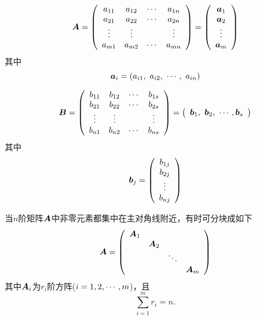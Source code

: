 \begin{dingyi}[矩阵的按行分块]
  $$
  \boldsymbol{A} = \left(
    \begin{array}{cccc}
      a_{11} & a_{12} & \cdots & a_{1n}\\
      a_{21} & a_{22} & \cdots & a_{2n}\\
      \vdots & \vdots & & \vdots \\
      a_{m1} & a_{m2} & \cdots & a_{mn}
    \end{array}
  \right)
  = \left(
    \begin{array}{c}
      {\boldsymbol{a}}_1\\
      {\boldsymbol{a}}_2\\
      \vdots \\
      {\boldsymbol{a}}_m
    \end{array}
  \right)
  $$
  其中
  $$
  {\boldsymbol{a}}_i = (a_{i1}, ~a_{i2}, ~\cdots, ~a_{in})
  $$
\end{dingyi}



\begin{dingyi}[矩阵的按列分块]
  $$
  \boldsymbol{B} = \left(
    \begin{array}{cccc}
      b_{11} & b_{12} & \cdots & b_{1s}\\
      b_{21} & b_{22} & \cdots & b_{2s}\\
      \vdots & \vdots & & \vdots \\
      b_{n1} & b_{n2} & \cdots & b_{ns}
    \end{array}
  \right)
  = \left(
    \begin{array}{c}
      {\boldsymbol{b}}_1, ~ {\boldsymbol{b}}_2, ~ \cdots, {\boldsymbol{b}}_s
    \end{array}
  \right)
  $$
  其中
  $$
  {\boldsymbol{b}}_j = \left(
    \begin{array}{c}
      b_{1j}\\
      b_{2j}\\
      \vdots\\
      b_{nj}
    \end{array}
  \right)
  $$
\end{dingyi}



当$n$阶矩阵$\boldsymbol{A}$中非零元素都集中在主对角线附近，有时可分块成如下
$$
\boldsymbol{A} = \left(
  \begin{array}{cccc}
    \boldsymbol{A}_1 & & &\\
    &\boldsymbol{A}_2&&\\
    &&\ddots&\\
    &&&\boldsymbol{A}_m
  \end{array}
\right)
$$
其中$\boldsymbol{A}_i$为$r_i$阶方阵($i=1,2,\cdots,m$)，且
$$
\sum_{i=1}^m r_i = n.
$$




